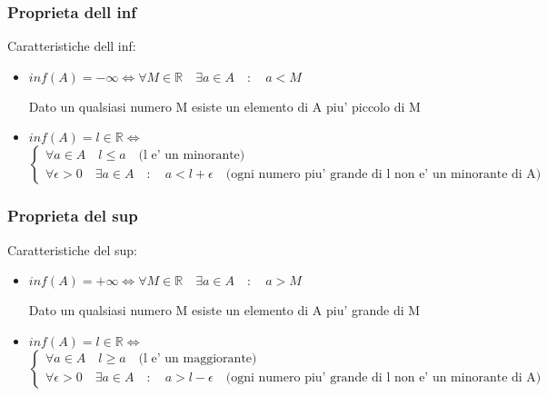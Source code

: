 \documentclass{article}
\begin{document}
\begin{flushleft}
        \subsubsection{Proprieta dell inf}
        \begin{flushleft}
        Caratteristiche dell inf:
            \begin{itemize}
                \item $inf(A)=-\infty \iff \forall M \in \mathbb{R} \quad \exists a \in A \quad : \quad a<M$
                \begin{flushright}
                   Dato un qualsiasi numero M esiste un elemento di A piu' piccolo di M
                \end{flushright}
                \item $inf(A)=l\in \mathbb{R} \iff$
                \begin{equation}
                    \begin{cases}
                        \forall a \in A \quad l \leq a \quad \text{(l e' un minorante)}\\
                        \forall \epsilon >0 \quad \exists a \in A \quad : \quad a<l+\epsilon \quad \text{(ogni numero piu' grande di l non e' un minorante di A)}
                    \end{cases}
                \end{equation}
            \end{itemize}
        \end{flushleft}
        \subsubsection{Proprieta del sup}
        \begin{flushleft}
        Caratteristiche del sup:
            \begin{itemize}
                \item $inf(A)=+\infty \iff \forall M \in \mathbb{R} \quad \exists a \in A \quad : \quad a>M$
                \begin{flushright}
                   Dato un qualsiasi numero M esiste un elemento di A piu' grande di M
                \end{flushright}
                \item $inf(A)=l\in \mathbb{R} \iff$
                \begin{equation}
                    \begin{cases}
                        \forall a \in A \quad l \geq a \quad \text{(l e' un maggiorante)}\\
                        \forall \epsilon >0 \quad \exists a \in A \quad : \quad a>l-\epsilon \quad \text{(ogni numero piu' grande di l non e' un minorante di A)}
                    \end{cases}
                \end{equation}
            \end{itemize}
        \end{flushleft}

\end{flushleft}
\end{document}
